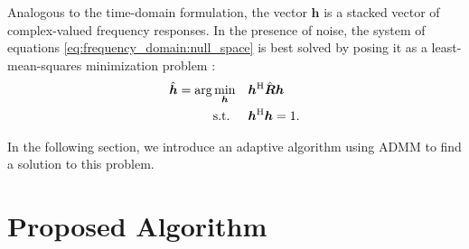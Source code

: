 \documentclass{article}
\newcommand{\hf}{{\bm{h}}}
\newcommand{\Rf}{{\bm{{R}}}}
\begin{document}
Analogous to the time-domain formulation, the vector \(\hf\) is a stacked vector of complex-valued frequency responses.
In the presence of noise, the system of equations \eqref{eq:frequency_domain:null_space} is best solved by posing it as a least-mean-squares minimization problem \cite{guanghanxuLeastsquaresApproachBlind1995,huangAdaptiveMultichannelLeast2002}:
\begin{align}
    \hat{\hf} = \arg \min_{\hf} \quad &\hf^\herm \hat{\Rf} \hf \label{eq:frequency_domain:min_prob}\\
    \text{s.t. } \quad &\hf^\herm \hf = 1.
\end{align}

In the following section, we introduce an adaptive algorithm using ADMM to find a solution to this problem.

\section{Proposed Algorithm}
\label{sec:proposed_method}

\end{document}
